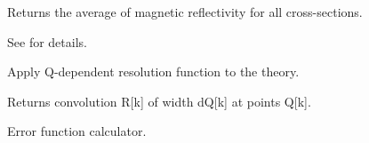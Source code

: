 \documentclass[letterpaper,10pt,english]{sphinxmanual}
\begin{document}

\begin{fulllineitems}
\label{api/reflectivity:refl1d.reflectivity.unpolarized_magnetic}
Returns the average of magnetic reflectivity for all cross-sections.

See {\hyperref[api/reflectivity:refl1d.reflectivity.magnetic_reflectivity]{}} for details.

\end{fulllineitems}


\begin{fulllineitems}
\label{api/reflectivity:refl1d.reflectivity.convolve}
Apply Q-dependent resolution function to the theory.

Returns convolution R{[}k{]} of width dQ{[}k{]} at points Q{[}k{]}.

\end{fulllineitems}


\begin{fulllineitems}
\label{api/reflectivity:refl1d.reflectivity.erf}
Error function calculator.

\end{fulllineitems}
\end{document}
